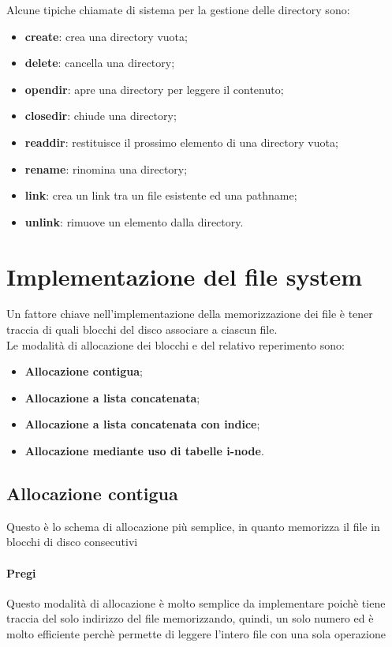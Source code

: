 \documentclass[12pt, letterpaper]{report}
\begin{document}
	Alcune tipiche chiamate di sistema per la gestione delle directory sono:
	\begin{itemize}
		\item \textbf{create}: crea una directory vuota;
		\item \textbf{delete}: cancella una directory;
		\item \textbf{opendir}: apre una directory per leggere il contenuto;
		\item \textbf{closedir}: chiude una directory;
		\item \textbf{readdir}: restituisce il prossimo elemento di una directory vuota;
		\item \textbf{rename}: rinomina una directory;
		\item \textbf{link}: crea un link tra un file esistente ed una pathname;
		\item \textbf{unlink}: rimuove un elemento dalla directory.
	\end{itemize}
	\section{Implementazione del file system}
	Un fattore chiave nell'implementazione della memorizzazione dei file è tener traccia di quali blocchi del disco associare a ciascun file. \\
	Le modalità di allocazione dei blocchi e del relativo reperimento sono:
	\begin{itemize}
		\item \textbf{Allocazione contigua};
		\item \textbf{Allocazione a lista concatenata};
		\item \textbf{Allocazione a lista concatenata con indice};
		\item \textbf{Allocazione mediante uso di tabelle i-node}.
	\end{itemize}
	\subsection{Allocazione contigua}
	Questo è lo schema di allocazione più semplice, in quanto memorizza il file in blocchi di disco consecutivi
	\paragraph{Pregi} Questo modalità di allocazione è molto semplice da implementare poichè tiene traccia del solo indirizzo del file memorizzando, quindi, un solo numero ed è molto efficiente perchè permette di leggere l'intero file con una sola operazione
\end{document}
